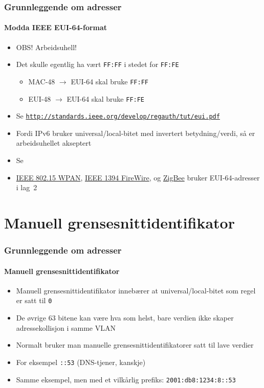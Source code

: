 \begin{frame}%
  \frametitle{Grunnleggende om adresser}
  \framesubtitle{Modda IEEE EUI-64-format}
  \begin{itemize}[<+->]
  \item OBS! Arbeidsuhell!
  \item Det skulle egentlig ha vært \texttt{FF:FF} i stedet for
    \texttt{FF:FE}
    \begin{itemize}
    \item MAC-48 \(\to\) EUI-64 skal bruke \texttt{FF:FF}
    \item EUI-48 \(\to\) EUI-64 skal bruke \texttt{FF:FE}
    \end{itemize}
  \item Se \texttt{\url{http://standards.ieee.org/develop/regauth/tut/eui.pdf}}
  \item Fordi IPv6 bruker universal/local-bitet med invertert
    betydning/verdi, så er arbeidsuhellet akseptert
  \item Se 
  \item \href{http://en.wikipedia.org/wiki/IEEE_802.15}{IEEE 802.15
      WPAN}, \href{http://en.wikipedia.org/wiki/IEEE_1394}{IEEE 1394
      FireWire}, og \href{http://en.wikipedia.org/wiki/ZigBee}{ZigBee}
    bruker EUI-64-adresser i lag~2
  \end{itemize}
\end{frame}

\section{Manuell grensesnittidentifikator}
\begin{frame}%
  \frametitle{Grunnleggende om adresser}
  \framesubtitle{Manuell grensesnittidentifikator}
  \pause
  \begin{itemize}[<+->]
  \item Manuell grensesnittidentifikator innebærer at
    universal/local-bitet som regel er satt til \texttt{0}
  \item De øvrige 63 bitene kan være hva som helst, bare verdien ikke
    skaper adressekollisjon i samme VLAN
  \item Normalt bruker man manuelle grensesnittidentifikatorer satt
    til lave verdier
  \item For eksempel \texttt{::53} \hfill(DNS-tjener, kanskje)
  \item Samme eksempel, men med et vilkårlig prefiks:
    \texttt{2001:db8:1234:8::\alert{53}}
  \end{itemize}
\end{frame}

